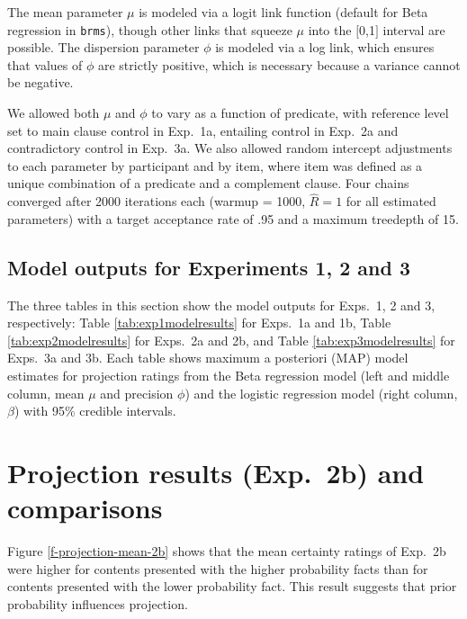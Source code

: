 \documentclass[11pt,fleqn]{article}
\newcommand{\6}{\mbox{$[\hspace*{-.6mm}[$}}
\newcommand{\9}{\mbox{$]\hspace*{-.6mm}]$}}
\begin{document}
The mean parameter $\mu$ is modeled via a logit link function (default for Beta regression in \verb|brms|), though other links that squeeze $\mu$ into the $[$0,1$]$ interval are possible. The dispersion parameter $\phi$ is modeled via a log link, which ensures that values of $\phi$ are strictly positive, which is necessary because a variance cannot be negative. 

We allowed both $\mu$ and $\phi$ to vary as a function of predicate, with reference level set to main clause control in Exp.~1a, entailing control in Exp.~2a and contradictory control in Exp.~3a. We also allowed random intercept adjustments to each parameter by participant and by item, where item was defined as a unique combination of a predicate and a complement clause. Four chains converged after 2000 iterations each (warmup = 1000, \(\hat{R}=1\) for all estimated parameters) with a target acceptance rate of .95 and a maximum treedepth of 15.

\subsection{Model outputs for Experiments 1, 2 and 3}\label{a-mo}

The three tables in this section show the model outputs for Exps.~1, 2 and 3, respectively: Table \ref{tab:exp1modelresults} for Exps.~1a and 1b, Table \ref{tab:exp2modelresults} for Exps.~2a and 2b, and Table \ref{tab:exp3modelresults} for Exps.~3a and 3b. Each table shows maximum a posteriori (MAP) model estimates for projection ratings from the Beta regression model (left and middle column, mean $\mu$ and precision $\phi$) and the logistic regression model (right column, $\beta$)  with 95\% credible intervals.

\section{Projection results (Exp.~2b) and comparisons}\label{a-comparison}

Figure \ref{f-projection-mean-2b} shows that the mean certainty ratings of Exp.~2b were higher for contents presented with the higher probability facts than for contents presented with the lower probability fact. This result suggests that prior probability influences projection.
\end{document}
